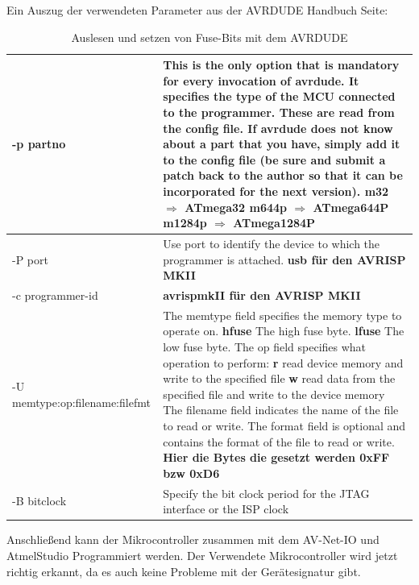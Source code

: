Ein Auszug der verwendeten Parameter aus der AVRDUDE Handbuch Seite:

\begin{table}[H]
\begin{tabular}{| p{} | p{} |}
\hline
-p partno & This is the only option that is mandatory for every invocation of
avrdude.  It specifies the type of the MCU connected to the programmer. These
are read from the config file.  If avrdude does not know about a part that you
have, simply add it to the config file (be sure and submit a patch back to the
author so that it can be incorporated for the next version). \newline
\textbf{m32 $\Rightarrow$ ATmega32} \newline 
\textbf{m644p $\Rightarrow$ ATmega644P} \newline
\textbf{m1284p $\Rightarrow$ ATmega1284P} \\ \hline
-P port & Use port to identify the device to which the programmer is attached. \textbf{usb für den AVRISP MKII}  \\ \hline 
-c programmer-id & \textbf{avrispmkII für den AVRISP MKII} \\ \hline
-U \hbox{memtype:op:filename:filefmt} &  
The \textrm{memtype} field specifies the memory type to operate on.\newline
\textbf{hfuse} The high fuse byte.\newline
\textbf{lfuse} The low fuse byte.\newline
The \textrm{op} field specifies what operation to perform:\newline
\textbf{r} read device memory and write to the specified file\newline
\textbf{w} read data from the specified file and write to the device memory \newline
The filename field indicates the name of the file to read or write.  The format field is optional and contains the format of the file to read or write. \newline
\textbf{Hier die Bytes die gesetzt werden 0xFF bzw 0xD6}
\\ \hline
-B bitclock & Specify the bit clock period for the JTAG interface or the ISP clock \\ \hline
\end{tabular}
\caption{Auslesen und setzen von Fuse-Bits mit dem AVRDUDE}
\label{tablelabel}
\end{table}
Anschließend kann der Mikrocontroller zusammen mit dem AV-Net-IO und AtmelStudio
Programmiert werden. Der Verwendete Mikrocontroller wird jetzt richtig erkannt,
da es auch keine Probleme mit der Gerätesignatur gibt.

